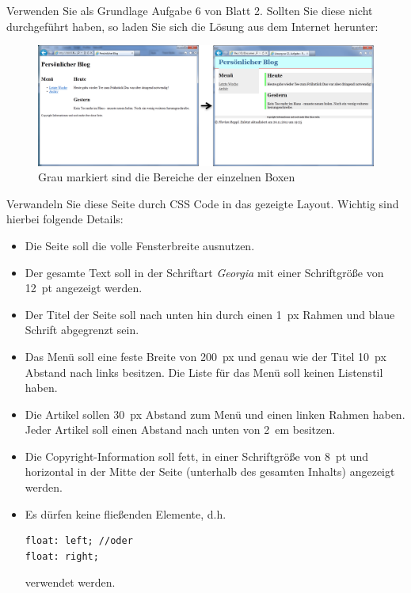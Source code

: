 %
\par Verwenden Sie als Grundlage Aufgabe 6 von Blatt 2. Sollten Sie diese nicht
durchgeführt haben, so laden Sie sich die Lösung aus dem Internet herunter:
%
\begin{figure}[!h]
\centering
\includegraphics[width=1\textwidth]{Exercises/Figures/applycss.png}
\caption{Grau markiert sind die Bereiche der einzelnen Boxen}
\label{fig:applycss}
\end{figure}
%
\par Verwandeln Sie diese Seite durch CSS Code in das gezeigte Layout. Wichtig
sind hierbei folgende Details:
%
\begin{itemize}
\item
Die Seite soll die volle Fensterbreite ausnutzen.
\item
Der gesamte Text soll in der Schriftart \emph{Georgia} mit einer Schriftgröße
von \qty{12}{pt} angezeigt werden.
\item
Der Titel der Seite soll nach unten hin durch einen \qty{1}{px} Rahmen und
blaue Schrift abgegrenzt sein.
\item
Das Menü soll eine feste Breite von \qty{200}{px} und genau wie der Titel
\qty{10}{px} Abstand nach links besitzen. Die Liste für das Menü soll keinen
Listenstil haben.
\item
Die Artikel sollen \qty{30}{px} Abstand zum Menü und einen linken Rahmen
haben. Jeder Artikel soll einen Abstand nach unten von \qty{2}{em} besitzen.
\item
Die Copyright-Information soll fett, in einer Schriftgröße von \qty{8}{pt} und
horizontal in der Mitte der Seite (unterhalb des gesamten Inhalts) angezeigt
werden. 
\item
Es dürfen keine fließenden Elemente, d.h.
%
\begin{lstlisting}
float: left; //oder
float: right;
\end{lstlisting}
%
verwendet werden.
\end{itemize}